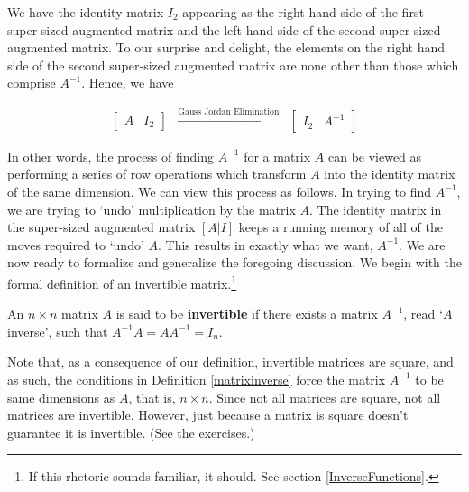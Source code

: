 \documentclass{ximera}
\begin{document}
We have the identity matrix $I_2$ appearing as the right hand side of the first super-sized augmented matrix and the left hand side of the second super-sized augmented matrix.  To our surprise and delight, the elements on the right hand side of the second super-sized augmented matrix are none other than those which comprise $A^{-1}$.  Hence, we have

\[ \begin{array}{ccc}

\left[ \begin{array}{c|c} A & I_2 \end{array} \right]

&
\xrightarrow{\text{Gauss Jordan Elimination}}

&

\left[ \begin{array}{c|c} I_2 & A^{-1} \end{array} \right] 

\end{array}\]

In other words, the process of finding $A^{-1}$ for a matrix $A$ can be viewed as performing a series of row operations which transform $A$ into the identity matrix of the same dimension.  We can view this process as follows.  In trying to find $A^{-1}$, we are trying to `undo' multiplication by the matrix $A$.  The identity matrix in the  super-sized augmented matrix $[A | I]$ keeps a running memory of all of the moves required to `undo' $A$. This results in exactly what we want, $A^{-1}$.  We are now ready to formalize and generalize the foregoing discussion.  We begin with the formal definition of an invertible matrix.\footnote{If this rhetoric sounds familiar, it should. See section \ref{InverseFunctions}.} 

\smallskip


\begin{definition}  \label{matrixinverse}  An $n \times n$ matrix $A$ is said to be \textbf{invertible} if there exists a matrix $A^{-1}$, read `$A$ inverse', such that $A^{-1}A = AA^{-1}=I_{n}$. 
\end{definition}


\smallskip

Note that, as a consequence of our definition, invertible matrices are square, and as such, the conditions in Definition \ref{matrixinverse} force the matrix $A^{-1}$ to be same dimensions as $A$, that is, $n \times n$.  Since not all matrices are square, not all matrices are invertible.  However, just because a matrix is square doesn't guarantee it is invertible.  (See the exercises.)   
\end{document}
